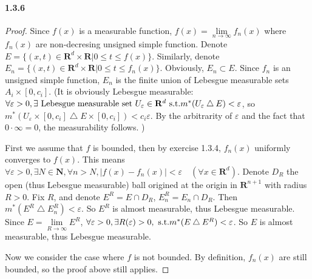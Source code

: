 \documentclass{article}
\begin{document}
\paragraph{1.3.6}
\begin{proof}
Since $f(x)$ is a measurable function, $f(x)=\lim\limits_{n\to\infty}f_n(x)$ where $f_n(x)$ are non-decresing unsigned simple function. Denote $E=\{(x,t)\in\mathbf{R}^d\times\mathbf{R}|0\leq t\leq f(x)\}$. Similarly, denote $E_n=\{(x,t)\in\mathbf{R}^d\times\mathbf{R}|0\leq t\leq f_n(x)\}$. Obviously, $E_n\subset E$. Since $f_n$ is an unsigned simple function, $E_n$ is the finite union of Lebesgue measurable sets $A_i\times [0,c_i]$. (It is obviously Lebesgue measurable: $\forall\varepsilon>0, \exists \text{ Lebesgue measurable set } U_\varepsilon\in\mathbf{R}^d\text{ s.t.} m^*(U_{\varepsilon}\bigtriangleup E)<\varepsilon $, so $m^*(U_\varepsilon\times [0,c_i]\bigtriangleup E\times [0,c_i])<c_i\varepsilon$. By the arbitrarity of $\varepsilon$ and the fact that $0\cdot \infty=0$, the measurability follows. )

First we assume that $f$ is bounded, then by exercise 1.3.4, $f_n(x)$ uniformly converges to $f(x)$. This means $\forall \varepsilon>0,\exists N\in\mathbf{N},\forall n>N, |f(x)-f_n(x)|<\varepsilon\quad (\forall x\in \mathbf{R}^d)$. Denote $D_R$ the open (thus Lebesgue measurable) ball origined at the origin in $\mathbf{R}^{n+1}$ with radius $R>0$. Fix $R$, and denote $E^R=E\cap D_R$, $E_n^R=E_n\cap D_R$. Then $m^*(E^R\bigtriangleup E_n^R)<\varepsilon$. So $E^R$ is almost measurable, thus Lebesgue measurable. Since $E=\lim\limits_{R\to\infty}E^R$, $\forall \varepsilon>0,\exists R(\varepsilon)>0, \text{ s.t.} m^*(E\bigtriangleup E^R)<\varepsilon$. So $E$ is almost measurable, thus Lebesgue measurable.

Now we consider the case where $f$ is not bounded. By definition, $f_n(x)$ are still bounded, so the proof above still applies.

\end{proof}
\end{document}
